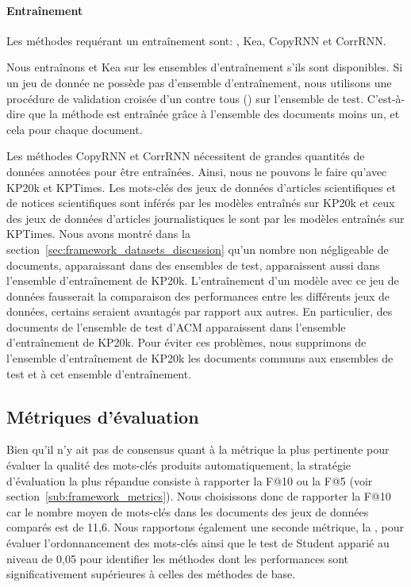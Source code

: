 \paragraph{Entraînement}
Les méthodes requérant un entraînement sont: \tfidf{}, Kea, CopyRNN et CorrRNN.

Nous entraînons \tfidf{} et Kea sur les ensembles d'entraînement s'ils sont disponibles.
Si un jeu de donnée ne possède pas d'ensemble d'entraînement, nous utilisons une procédure de validation croisée d'un contre tous () sur l'ensemble de test.
C'est-à-dire que la méthode est entraînée grâce à l'ensemble des documents moins un, et cela pour chaque document.

Les méthodes CopyRNN et CorrRNN nécessitent de grandes quantités de données annotées pour être entraînées.
Ainsi, nous ne pouvons le faire qu'avec KP20k et KPTimes.
Les mots-clés des jeux de données d'articles scientifiques et de notices scientifiques sont inférés par les modèles entraînés sur KP20k et ceux des jeux de données d'articles journalistiques le sont par les modèles entraînés sur KPTimes.
%
Nous avons montré dans la section~\ref{sec:framework_datasets_discussion} qu'un nombre non négligeable de documents, apparaissant dans des ensembles de test, apparaissent aussi dans l'ensemble d'entraînement de KP20k.
L'entraînement d'un modèle avec ce jeu de données fausserait la comparaison des performances entre les différents jeux de données, certains seraient avantagés par rapport aux autres.
En particulier,  des documents de l'ensemble de test d'ACM apparaissent dans l'ensemble d'entraînement de KP20k.
Pour éviter ces problèmes, nous supprimons de l'ensemble d'entraînement de KP20k les documents communs aux ensembles de test et à cet ensemble d'entraînement.


\subsection{Métriques d'évaluation}

Bien qu'il n'y ait pas de consensus quant à la métrique la plus pertinente pour évaluer la qualité des mots-clés produits automatiquement, la stratégie d'évaluation la plus répandue consiste à rapporter la F@10 ou la F@5 (voir section~\ref{sub:framework_metrics}).
Nous choisissons donc de rapporter la F@10 car le nombre moyen de mots-clés dans les documents des jeux de données comparés est de 11,6.
Nous rapportons également une seconde métrique, la \map{}, pour évaluer l'ordonnancement des mots-clés ainsi que le test de Student apparié au niveau de 0,05 pour identifier les méthodes dont les performances sont significativement supérieures à celles des méthodes de base.

